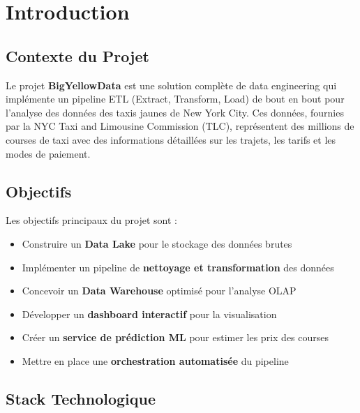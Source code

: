 \documentclass[12pt,a4paper]{report}
\begin{document}
\chapter{Introduction}

\section{Contexte du Projet}

Le projet \textbf{BigYellowData} est une solution complète de data engineering qui implémente un pipeline ETL (Extract, Transform, Load) de bout en bout pour l'analyse des données des taxis jaunes de New York City. Ces données, fournies par la NYC Taxi and Limousine Commission (TLC), représentent des millions de courses de taxi avec des informations détaillées sur les trajets, les tarifs et les modes de paiement.

\section{Objectifs}

Les objectifs principaux du projet sont :

\begin{itemize}[leftmargin=2cm]
    \item Construire un \textbf{Data Lake} pour le stockage des données brutes
    \item Implémenter un pipeline de \textbf{nettoyage et transformation} des données
    \item Concevoir un \textbf{Data Warehouse} optimisé pour l'analyse OLAP
    \item Développer un \textbf{dashboard interactif} pour la visualisation
    \item Créer un \textbf{service de prédiction ML} pour estimer les prix des courses
    \item Mettre en place une \textbf{orchestration automatisée} du pipeline
\end{itemize}

\section{Stack Technologique}
\end{document}

